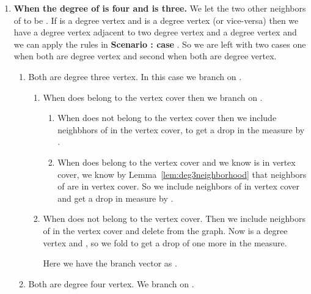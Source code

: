 \documentclass[svgnames]{llncs}
\begin{document}
{\begin{enumerate}[resume=scenarioC,label=\bfseries Case~\arabic*:]
\item {\bf When the degree of  is four and  is three.}
We let the two other neighbors of  to be . If  is a degree  vertex and  is a degree  vertex (or vice-versa) then we have a degree  vertex  adjacent 
to two degree  vertex  and a degree  vertex
 and we can apply the rules in {\bf Scenario : case }. So we are left with two cases one when both  are degree  vertex and second when both  are degree  vertex.
\begin{enumerate}
 \item Both  are degree three vertex. In this case we branch on .
 \begin{enumerate}
  \item When  does belong to the vertex cover then we branch on .
  \begin{enumerate}
   \item When  does not belong to the vertex cover then we include neighbhors of  in the vertex cover, to get a drop in the measure by .
   \item When  does belong to the vertex cover and we know  is in vertex cover, we know by Lemma~\ref{lem:deg3neighborhood} that neighbors of  are in vertex cover. So we include neighbors of  in vertex cover and get
   a drop in measure by .
  \end{enumerate}
  \item When  does not belong to the vertex cover. Then we include neighbors of  in the vertex cover and delete  from the graph. Now  is a degree  vertex and ,
  so we fold  to get a drop of one more in the measure.
  

  Here we have the branch vector as .
 \end{enumerate}
\item Both  are degree four vertex. We branch on .


\end{enumerate}
\end{enumerate}}
\end{document}
